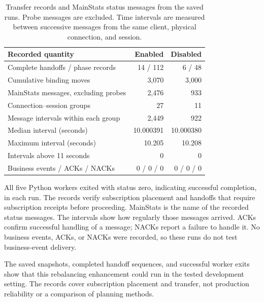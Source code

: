 \documentclass[10pt,a4paper]{article}
\begin{document}
\begin{table}[htbp]
\centering
\small
\caption{Transfer records and MainStats status messages from the saved runs. Probe messages are excluded. Time intervals are measured between successive messages from the same client, physical connection, and session.}
\label{tab:downstream-handoff-telemetry}
\begin{tabularx}{\textwidth}{@{}Xrr@{}}
\toprule
Recorded quantity & Enabled & Disabled \\
\midrule
Complete handoffs / phase records & 14 / 112 & 6 / 48 \\
Cumulative binding moves & 3,070 & 3,000 \\
MainStats messages, excluding probes & 2,476 & 933 \\
Connection--session groups & 27 & 11 \\
Message intervals within each group & 2,449 & 922 \\
Median interval (seconds) & 10.000391 & 10.000380 \\
Maximum interval (seconds) & 10.205 & 10.208 \\
Intervals above 11 seconds & 0 & 0 \\
Business events / ACKs / NACKs & 0 / 0 / 0 & 0 / 0 / 0 \\
\bottomrule
\end{tabularx}
\end{table}

All five Python workers exited with status zero, indicating successful completion, in each run. The records verify subscription placement and handoffs that require subscription receipts before proceeding. MainStats is the name of the recorded status messages. The intervals show how regularly those messages arrived. ACKs confirm successful handling of a message; NACKs report a failure to handle it. No business events, ACKs, or NACKs were recorded, so these runs do not test business-event delivery.

The saved snapshots, completed handoff sequences, and successful worker exits show that this rebalancing enhancement could run in the tested development setting. The records cover subscription placement and transfer, not production reliability or a comparison of planning methods.

\FloatBarrier
\end{document}
